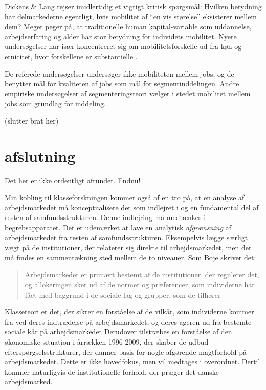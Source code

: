 Dickens \& Lang rejser imidlertidig et vigtigt kritisk spørgsmål: Hvilken betydning har delmarkederne egentligt, hvis mobilitet af “en vis størelse” eksisterer mellem dem?  Meget peger på, at traditionelle human kapital-variable som uddannelse, arbejdserfaring og alder har stor betydning for individets mobilitet. Nyere undersøgelser har især koncentreret sig om mobilitetsforskelle ud fra køn og etnicitet, hvor forskellene er substantielle \parencite[93-4]{Leontaridi1998}. %



De referede undersøgelser undersøger ikke mobiliteten mellem jobs, og de benytter mål for kvaliteten af jobs som mål for segmentinddelingen. Andre empiriske undersøgelser af segmenteringsteori vælger i stedet mobilitet mellem jobs som grundlag for inddeling.

(slutter brat her)

\section{afslutning  \label{sec_}}

Det her er ikke ordentligt afrundet. Endnu!

Min kobling til klasseforskningen kommer også af en tro på, at  en analyse af arbejdsmarkedet må konceptualisere det som indlejret i og en fundamental del af resten af samfundsstrukturen. Denne indlejring må medtænkes i begrebsapparatet. Det er udemærket at lave en analytisk \emph{afgrænsning} af arbejdsmarkedet fra resten af samfundsstrukturen. Eksempelvis lægge særligt vægt på de institutioner, der relaterer sig direkte til arbejdsmarkedet, men der må findes en sammentækning sted mellem de to niveauer. Som Boje skriver det:

%
\begin{quote} \small %
Arbejdsmarkedet er primært bestemt af de institutioner, der regulerer det, og allokeringen sker ud af de normer og præferencer, som individerne har fået med baggrund i de sociale lag og grupper, som de tilhører
\end{quote}
%

Klasseteori er det, der sikrer en forståelse af de vilkår, som individerne kommer fra ved deres indtrædelse på arbejdsmarkedet, og deres ageren ud fra bestemte sociale kår på arbejdsmarkedet Derudover tilstræbes en forståelse af den økonomiske situation i årrækken 1996-2009, der skaber de udbud-efterspørgselsstrukturer, der danner basis for nogle afgørende magtforhold på arbejdsmarkedet. Dette er ikke hovedfokus, men vil medtages i overordnet. Dertil kommer naturligvis de institutionelle forhold, der præger det danske arbejdsmarked.



